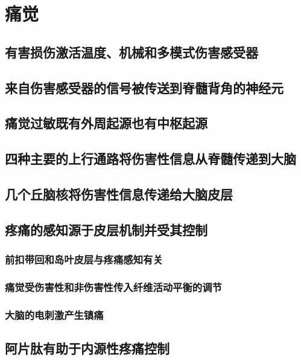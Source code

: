 \chapter{痛觉}

\section{有害损伤激活温度、机械和多模式伤害感受器}

\section{来自伤害感受器的信号被传送到脊髓背角的神经元}

\section{痛觉过敏既有外周起源也有中枢起源}

\section{四种主要的上行通路将伤害性信息从脊髓传递到大脑}

\section{几个丘脑核将伤害性信息传递给大脑皮层}

\section{疼痛的感知源于皮层机制并受其控制}
\subsection{前扣带回和岛叶皮层与疼痛感知有关}
\subsection{痛觉受伤害性和非伤害性传入纤维活动平衡的调节}
\subsection{大脑的电刺激产生镇痛}

\section{阿片肽有助于内源性疼痛控制}
